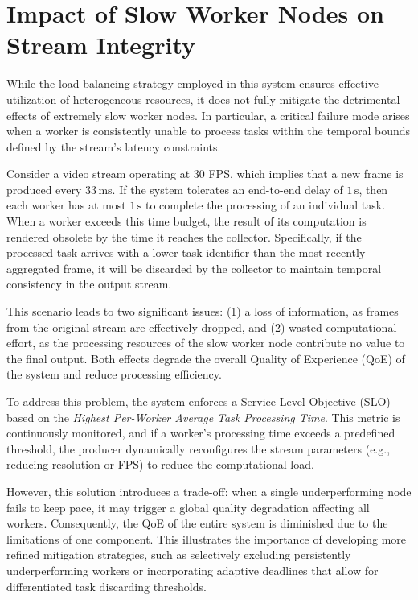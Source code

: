 \section{Impact of Slow Worker Nodes on Stream Integrity}

While the load balancing strategy employed in this system ensures effective utilization of heterogeneous resources, it does not fully mitigate the detrimental effects of extremely slow worker nodes. In particular, a critical failure mode arises when a worker is consistently unable to process tasks within the temporal bounds defined by the stream's latency constraints.

Consider a video stream operating at 30 FPS, which implies that a new frame is produced every \(33\,\text{ms}\). If the system tolerates an end-to-end delay of \(1\,\text{s}\), then each worker has at most \(1\,\text{s}\) to complete the processing of an individual task. When a worker exceeds this time budget, the result of its computation is rendered obsolete by the time it reaches the collector. Specifically, if the processed task arrives with a lower task identifier than the most recently aggregated frame, it will be discarded by the collector to maintain temporal consistency in the output stream.

This scenario leads to two significant issues: (1) a loss of information, as frames from the original stream are effectively dropped, and (2) wasted computational effort, as the processing resources of the slow worker node contribute no value to the final output. Both effects degrade the overall Quality of Experience (QoE) of the system and reduce processing efficiency.

To address this problem, the system enforces a Service Level Objective (SLO) based on the \textit{Highest Per-Worker Average Task Processing Time}. This metric is continuously monitored, and if a worker's processing time exceeds a predefined threshold, the producer dynamically reconfigures the stream parameters (e.g., reducing resolution or FPS) to reduce the computational load. 

However, this solution introduces a trade-off: when a single underperforming node fails to keep pace, it may trigger a global quality degradation affecting all workers. Consequently, the QoE of the entire system is diminished due to the limitations of one component. This illustrates the importance of developing more refined mitigation strategies, such as selectively excluding persistently underperforming workers or incorporating adaptive deadlines that allow for differentiated task discarding thresholds.